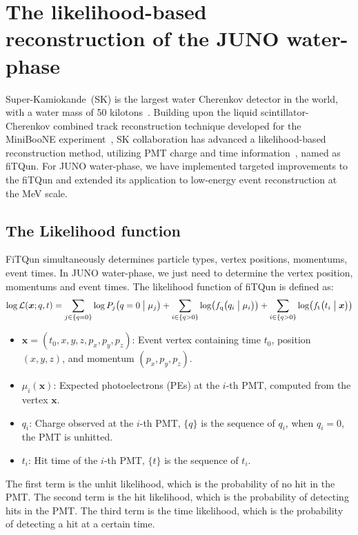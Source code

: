 
\section{The likelihood-based reconstruction of the JUNO water-phase}
Super-Kamiokande~(SK) is the largest water Cherenkov detector in the world, with a water mass of 50 kilotons~\cite{SK}.
Building upon the liquid scintillator-Cherenkov combined track reconstruction technique developed for the MiniBooNE experiment~\cite{minibone}, SK collaboration has advanced a likelihood-based reconstruction method, utilizing PMT charge and time information~\cite{SKfiTQun}, named as fiTQun.  For JUNO water-phase, we have implemented targeted improvements to the fiTQun and extended its application to low-energy event reconstruction at the MeV scale.

\subsection{The Likelihood function}
FiTQun simultaneously determines particle types, vertex positions, momentums, event times.
In JUNO water-phase, we just need to determine the vertex position, momentums and event times.
The likelihood function of fiTQun is defined as:
\begin{equation}
	\log \mathcal{L}(\boldsymbol{x};{q},{t}) = \sum_{j \in \{q=0\}} \log P_j \bigl( q=0\bigm| \mu_j \bigr) + \sum_{i \in \{q>0\}} \log \bigl( f_{\mathrm{q}}\bigl( q_i \bigm| \mu_i \bigr) \bigr) + \sum_{i \in \{q>0\}} \log \bigl( f_{\mathrm{t}} \bigl( t_i \bigm| \boldsymbol{x} \bigr) \bigr)
\end{equation}
\begin{itemize}
	\item $\boldsymbol{x} = (t_0, x, y, z, p_x, p_y, p_z)$: Event vertex containing time $t_0$, position $(x,y,z)$, and momentum $(p_x,p_y,p_z)$.
	\item $\mu_i(\boldsymbol{x})$: Expected photoelectrons (PEs) at the $i$-th PMT, computed from the vertex $\boldsymbol{x}$.
	\item $q_i$: Charge observed at the $i$-th PMT, $\{q\}$ is the sequence of $q_i$, when $q_i=0$, the PMT is unhitted.
	\item $t_i$: Hit time of the $i$-th PMT, $\{t\}$ is the sequence of $t_i$.
\end{itemize}

The first term is the unhit likelihood, which is the probability of no hit in the PMT. The second term is the hit likelihood, which is the probability of detecting hits in the PMT. The third term is the time likelihood, which is the probability of detecting a hit at a certain time.

